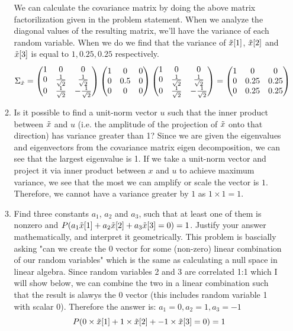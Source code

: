 \documentclass[12pt,twoside]{article}
\newcommand{\rx}{\rnd{ x}  }
\newcommand{\rnd}{\Tilde}
\begin{document}
\begin{enumerate}
\begin{enumerate}
\subitem We can calculate the covariance matrix by doing the above matrix factorilization given in the problem statement. When we analyze the diagonal values of the resulting matrix, we'll have the variance of each random variable. When we do we find that the variance of $\rx[1]$, $\rx[2]$ and $\rx[3]$ is equal to $1,0.25,0.25$ respectively.
\begin{equation}
\Sigma_{\rx} = 
  \begin{pmatrix}
1 & 0 & 0 \\ 
0 & \frac{1}{\sqrt{2}} & \frac{1}{\sqrt{2}} \\
0 & \frac{1}{\sqrt{2}} & -\frac{1}{\sqrt{2}} 
\end{pmatrix}
\begin{pmatrix}
1 & 0 & 0 \\ 
0 & 0.5 & 0 \\ 
0 & 0 & 0
\end{pmatrix} 
\begin{pmatrix} 1 & 0 & 0 \\ 
0 & \frac{1}{\sqrt{2}} & \frac{1}{\sqrt{2}} \\ 
0 & \frac{1}{\sqrt{2}} & -\frac{1}{\sqrt{2}} 
\end{pmatrix}  =
\begin{pmatrix}
1 & 0 & 0 \\ 
0 & 0.25 & 0.25 \\ 
0 & 0.25 & 0.25
\end{pmatrix} 
\end{equation}


\item Is it possible to find a unit-norm vector $u$ such that the inner product between $\rx$ and $u$ (i.e. the amplitude of the projection of $\rx$ onto that direction) has variance greater than 1?
\subitem Since we are given the eigenvalues and eigenvectors from the covariance matrix eigen decomposition, we can see that the largest eigenvalue is 1. If we take a unit-norm vector and project it via inner product between $x$ and $u$ to achieve maximum variance, we see that the most we can amplify or scale the vector is $1$. Therefore, we cannot have a variance greater by $1$ as $1\times 1 = 1$.

\item Find three constants $a_1$, $a_2$ and $a_3$, such that at least one of them is nonzero and $P(a_1 \rx[1]+ a_2 \rx[2] + a_3 \rx[3] = 0) = 1$. Justify your answer mathematically, and interpret it geometrically.  
\subitem 
This problem is bascially asking "can we create the 0 vector for some (non-zero) linear combination of our random variables" which is the same as calculating a null space in linear algebra. Since random variables 2 and 3 are correlated 1:1 which I will show below, we can combine the two in a linear combination such that the result is alawys the 0 vector (this includes random variable 1 with scalar 0). Therefore the answer is: $a_1 = 0, a_2 = 1, a_3 = -1$
$$
    P( 0\times  \rx[1]+ 1 \times \rx[2] + -1 \times \rx[3] = 0) = 1
$$


\end{enumerate}
\end{enumerate}
\end{document}

